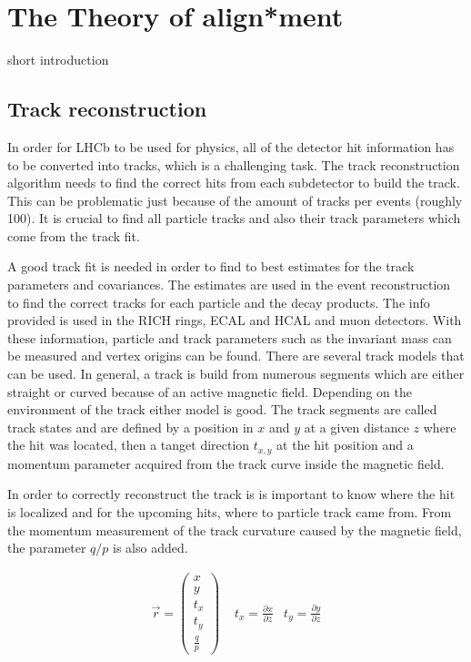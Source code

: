 \chapter{The Theory of align*ment}
\label{sec:align*Theory}

short introduction

\section{Track reconstruction}
\label{sec:kalman}

In order for LHCb to be used for physics, all of the detector hit information has to be converted into tracks, which is a challenging task.
The track reconstruction algorithm needs to find the correct hits from each subdetector to build the track. This can be problematic just because of the amount of tracks per events (roughly 100).
It is crucial to find all particle tracks and also their track parameters which come from the track fit.

A good track fit is needed in order to find to best estimates for the track parameters and covariances. The estimates are used in the event reconstruction to find the correct tracks for each particle and the decay products. The info provided is used in the RICH rings, ECAL and HCAL and muon detectors. With these information, particle and track parameters such as the invariant mass can be measured and vertex origins can be found.
There are several track models that can be used. In general, a track is build from numerous segments which are either straight or curved because of an active magnetic field. Depending on the environment of the track either model is good.
The track segments are called track states and are defined by a position in $x$ and $y$ at a given distance $z$ where the hit was located, then a tanget direction $t_{x,y}$ at the hit position and a momentum parameter acquired from the track curve inside the magnetic field\cite{VanTilburg}.

In order to correctly reconstruct the track is is important to know where the hit is localized and for the upcoming hits, where to particle track came from. From the momentum measurement of the track curvature caused by the magnetic field, the parameter $q/p$ is also added.

\begin{align*}
  \vec{r} = \left(\begin{array}{c} x \\ y \\ t_x \\ t_y \\ \frac{q}{p}\end{array}\right) &\,\, t_x = \frac{\partial x}{\partial z} & t_y = \frac{\partial y}{\partial z}
\end{align*}

